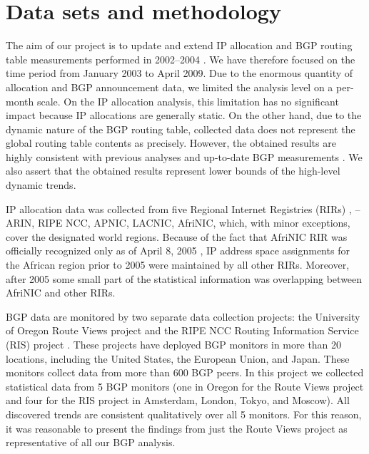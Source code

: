 \section{Data sets and methodology}
\label{sec:data sets}

The aim of our project is to update and extend IP allocation and BGP routing
table measurements performed in 2002--2004
\cite{Meng:2003:An-analysis-of-BGP-routing} \cite{Xu:2003:IPv4-Address}
\cite{Meng:2005:IPv4-address}. We have therefore focused on the time period
from January 2003 to April 2009. Due to the enormous quantity of allocation
and BGP announcement data, we limited the analysis level on a per-month scale.
On the IP allocation analysis, this limitation has no significant impact
because IP allocations are generally static. On the other hand, due to the
dynamic nature of the BGP routing table, collected data does not represent the
global routing table contents as precisely. However, the obtained results are
highly consistent with previous analyses \cite{Meng:2005:IPv4-address} and
up-to-date BGP measurements \cite{::IPv4-Address-Report}. We also assert that
the obtained results represent lower bounds of the high-level dynamic trends.


IP allocation data was collected from five Regional Internet Registries (RIRs)
\cite{::IANA----Number}, -- ARIN, RIPE NCC, APNIC, LACNIC, AfriNIC, which,
with minor exceptions, cover the designated world regions. Because of the fact
that AfriNIC RIR was officially recognized only as of April 8, 2005
\cite{AKPLOGAN:2005:AfriNIC-now-officially}, IP address space assignments for
the African region prior to 2005 were maintained by all other RIRs. Moreover,
after 2005 some small part of the statistical information was overlapping
between AfriNIC and other RIRs.

BGP data are monitored by two separate data collection projects: the
University of Oregon Route Views project \cite{::Route-Views} and the RIPE NCC
Routing Information Service (RIS) project \cite{::RIS}. These projects have
deployed BGP monitors in more than 20 locations, including the United States,
the European Union, and Japan. These monitors collect data from more than 600
BGP peers. In this project we collected statistical data from 5 BGP monitors
(one in Oregon for the Route Views project and four for the RIS project in
Amsterdam, London, Tokyo, and Moscow). All discovered trends are consistent
qualitatively over all 5 monitors. For this reason, it was reasonable to
present the findings from just the Route Views project as representative of
all our BGP analysis.

